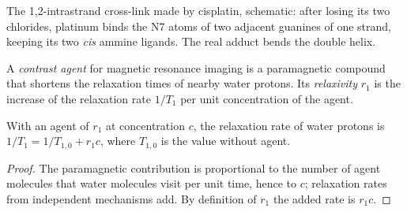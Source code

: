 \begin{omfigure}

{\small The 1,2-intrastrand cross-link made by cisplatin, schematic: after
losing its two chlorides, platinum binds the N7 atoms of two adjacent guanines
of one strand, keeping its two \textit{cis} ammine ligands. The real adduct
bends the double helix.}
\end{omfigure}

\begin{definition}\label{def:b3:bioinorganic:contrast}
A \emph{contrast agent} for magnetic resonance imaging is
a paramagnetic compound that shortens the relaxation times of nearby water
protons. Its \emph{relaxivity} $r_1$ is the increase of the
relaxation rate $1/T_1$ per unit concentration of the agent.
\end{definition}

\begin{proposition}\label{prop:b3:bioinorganic:relaxivity}
With an agent of  $r_1$ at concentration $c$, the relaxation rate of water
protons is $1/T_1 = 1/T_{1,0} + r_1c$, where $T_{1,0}$ is the value without agent.
\end{proposition}

\begin{proof}
The paramagnetic contribution is proportional to the number of agent molecules
that water molecules visit per unit time, hence to $c$; relaxation rates from
independent mechanisms add. By definition of $r_1$ the added rate is $r_1c$.
\end{proof}


